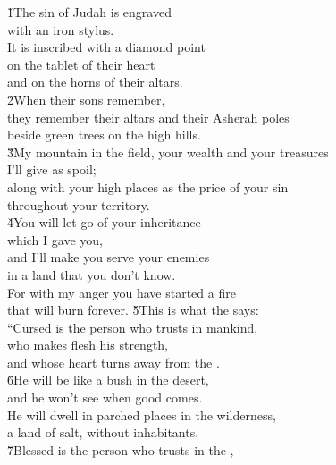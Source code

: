\begin{poetry}
\poeml {}
\v{1}The sin of Judah is engraved \\
\poeml with an iron stylus. \\
\poeml It is inscribed with a diamond point \\
\poeml on the tablet of their heart \\
\poemlll       and on the horns of their altars. \\
\poeml \v{2}When their sons remember, \\
\poemll    they remember their altars and their Asherah poles \\
\poemlll       beside green trees on the high hills. \\
\poeml \v{3}My mountain in the field, your wealth and your treasures \\
\poemll    I'll give as spoil; \\
\poeml along with your high places as the price of your sin \\
\poemll    throughout your territory. \\
\poeml \v{4}You will let go of your inheritance \\
\poemll    which I gave you, \\
\poeml and I'll make you serve your enemies \\
\poemll    in a land that you don't know. \\
\poeml For with my anger you have started a fire \\
\poemll    that will burn forever.
\poeml \v{5}This is what the  says: \\
\poeml ``Cursed is the person who trusts in mankind, \\
\poemll    who makes flesh his strength, \\
\poemlll       and whose heart turns away from the . \\
\poeml \v{6}He will be like a bush in the desert, \\
\poemll    and he won't see when good comes. \\
\poeml He will dwell in parched places in the wilderness, \\
\poemll    a land of salt, without inhabitants. \\
\poeml \v{7}Blessed is the person who trusts in the , \\

\end{poetry}
